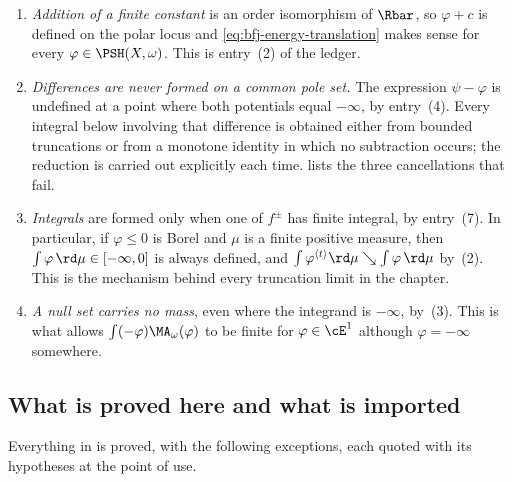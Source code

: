 \begin{enumerate}
\item\label{itm:ch26-ledger:add}
 \emph{Addition of a finite constant} is an order isomorphism of \(\Rbar\), so
 \(\varphi+c\) is defined on the polar locus and
 \eqref{eq:bfj-energy-translation} makes sense for every
 \(\varphi\in\PSH(X,\omega)\).  This is entry~(2) of the ledger.
\item\label{itm:ch26-ledger:diff}
 \emph{Differences are never formed on a common pole set.}  The expression
 \(\psi-\varphi\) is undefined at a point where both potentials equal
 \(-\infty\), by entry~(4).  Every integral below involving that difference is
 obtained either from bounded truncations or from a monotone identity in which
 no subtraction occurs; the reduction is carried out explicitly each time.
  lists the three cancellations that fail.
\item\label{itm:ch26-ledger:integral}
 \emph{Integrals} are formed only when one of \(f^\pm\) has finite integral,
 by entry~(7).  In particular, if \(\varphi\leq0\) is Borel and \(\mu\) is a
 finite positive measure, then \(\int\varphi\,\rd\mu\in[-\infty,0]\) is always
 defined, and
 \(\int\varphi^{\langle t\rangle}\rd\mu\searrow\int\varphi\,\rd\mu\) by
 \,(2).  This is the mechanism behind every
 truncation limit in the chapter.
\item\label{itm:ch26-ledger:null}
 \emph{A null set carries no mass}, even where the integrand is \(-\infty\),
 by \,(3).  This is what allows
 \(\int(-\varphi)\MA_\omega(\varphi)\) to be finite for
 \(\varphi\in\cE^1\) although \(\varphi=-\infty\) somewhere.
\end{enumerate}

\subsection{What is proved here and what is imported}
\label{sec:ch26-imported}

Everything in  is proved,
with the following exceptions, each quoted with its hypotheses at the point of
use.

